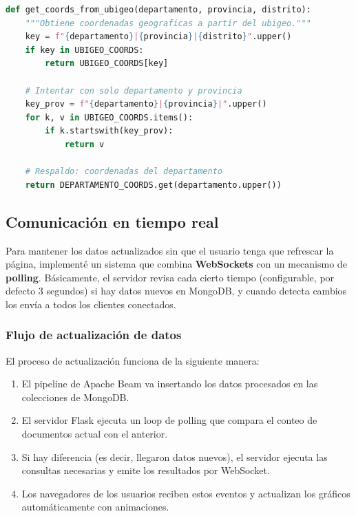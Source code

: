 \documentclass[12pt,a4paper]{article}
\begin{document}
\begin{lstlisting}[language=Python, caption={Función de resolución de coordenadas por ubigeo}, label={lst:coords-resolution}]
def get_coords_from_ubigeo(departamento, provincia, distrito):
    """Obtiene coordenadas geograficas a partir del ubigeo."""
    key = f"{departamento}|{provincia}|{distrito}".upper()
    if key in UBIGEO_COORDS:
        return UBIGEO_COORDS[key]

    # Intentar con solo departamento y provincia
    key_prov = f"{departamento}|{provincia}|".upper()
    for k, v in UBIGEO_COORDS.items():
        if k.startswith(key_prov):
            return v

    # Respaldo: coordenadas del departamento
    return DEPARTAMENTO_COORDS.get(departamento.upper())
\end{lstlisting}

\subsection{Comunicación en tiempo real}\label{comunicacion-tiempo-real}

Para mantener los datos actualizados sin que el usuario tenga que refrescar la página, implementé un sistema que combina \textbf{WebSockets} con un mecanismo de \textbf{polling}. Básicamente, el servidor revisa cada cierto tiempo (configurable, por defecto 3 segundos) si hay datos nuevos en MongoDB, y cuando detecta cambios los envía a todos los clientes conectados.

\subsubsection{Flujo de actualización de datos}

El proceso de actualización funciona de la siguiente manera:

\begin{enumerate}
    \item El pipeline de Apache Beam va insertando los datos procesados en las colecciones de MongoDB.
    \item El servidor Flask ejecuta un loop de polling que compara el conteo de documentos actual con el anterior.
    \item Si hay diferencia (es decir, llegaron datos nuevos), el servidor ejecuta las consultas necesarias y emite los resultados por WebSocket.
    \item Los navegadores de los usuarios reciben estos eventos y actualizan los gráficos automáticamente con animaciones.
\end{enumerate}
\end{document}

